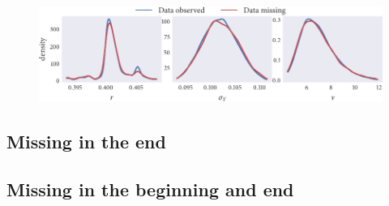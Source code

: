 \begin{figure}[tbp]
  \includegraphics{beg/compare_params.pdf}
  \caption{}
  \label{fig:beg_compare}
\end{figure}


\subsection{Missing in the end}

\subsection{Missing in the beginning and end}

